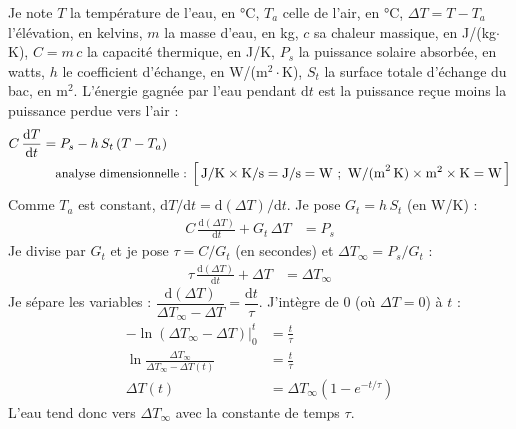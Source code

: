 \begin{demonstration}
Je note $T$ la température de l'eau, en °C, $T_a$ celle de l'air, en °C, $\Delta T = T - T_a$ l'élévation, en kelvins, $m$ la masse d'eau, en kg, $c$ sa chaleur massique, en J/(kg$\cdot$K), $C = m\,c$ la capacité thermique, en J/K, $P_s$ la puissance solaire absorbée, en watts, $h$ le coefficient d'échange, en W/(m$^2\cdot$K), $S_t$ la surface totale d'échange du bac, en m$^2$. L'énergie gagnée par l'eau pendant $\mathrm{d}t$ est la puissance reçue moins la puissance perdue vers l'air :
\begin{align*}
C\,\frac{\mathrm{d}T}{\mathrm{d}t} &= P_s - h\,S_t\,(T - T_a)\\
\dimline{\unit{J/K}\times\unit{K/s}=\unit{J/s}=\unit{W}\ ;\ \unit{W/(m^2\,K)}\times\unit{m^2}\times\unit{K}=\unit{W}}
\end{align*}
Comme $T_a$ est constant, $\mathrm{d}T/\mathrm{d}t = \mathrm{d}(\Delta T)/\mathrm{d}t$. Je pose $G_t = h\,S_t$ (en W/K) :
\begin{align*}
C\,\frac{\mathrm{d}(\Delta T)}{\mathrm{d}t} + G_t\,\Delta T &= P_s
\end{align*}
Je divise par $G_t$ et je pose $\tau = C/G_t$ (en secondes) et $\Delta T_{\infty} = P_s/G_t$ :
\begin{align*}
\tau\,\frac{\mathrm{d}(\Delta T)}{\mathrm{d}t} + \Delta T &= \Delta T_{\infty}
\end{align*}
Je sépare les variables : $\dfrac{\mathrm{d}(\Delta T)}{\Delta T_{\infty} - \Delta T} = \dfrac{\mathrm{d}t}{\tau}$. J'intègre de $0$ (où $\Delta T = 0$) à $t$ :
\begin{align*}
-\ln\!\left(\Delta T_{\infty} - \Delta T\right) \Big|_{0}^{t} &= \frac{t}{\tau}\\
\ln\frac{\Delta T_{\infty}}{\Delta T_{\infty} - \Delta T(t)} &= \frac{t}{\tau}\\
\Delta T(t) &= \Delta T_{\infty}\left(1 - e^{-t/\tau}\right)
\end{align*}
L'eau tend donc vers $\Delta T_{\infty}$ avec la constante de temps $\tau$.
\end{demonstration}

